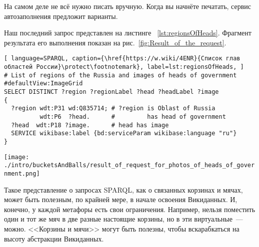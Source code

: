 На самом деле не всё нужно писать вручную. Когда вы начнёте печатать, сервис автозаполнения предложит варианты.

Наш последний запрос представлен на листинге ~\ref{lst:regionsOfHeads}. Фрагмент результата его выполнения показан на рис.~\ref{fig:Result_of_the_request}.

\lstset{numbers=left, firstnumber=1, frame=single}
\begin{lstlisting}[ language=SPARQL, caption={\href{https://w.wiki/4ENR}{Список глав областей России}\protect\footnotemark}, label=lst:regionsOfHeads, ]
# List of regions of the Russia and images of heads of government
#defaultView:ImageGrid
SELECT DISTINCT ?region ?regionLabel ?head ?headLabel ?image
{
  ?region wdt:P31 wd:Q835714; # ?region is Oblast of Russia
          wdt:P6  ?head.      #         has head of government
  ?head  wdt:P18 ?image.      # head has image
  SERVICE wikibase:label {bd:serviceParam wikibase:language "ru"} 
}
\end{lstlisting}


\begin{figure*}[h!]
\texttt{[image: ./intro/bucketsAndBalls/result\_of\_request\_for\_photos\_of\_heads\_of\_government.png]}
\caption{Результат запроса в виде сетки изображений.}
\label{fig:Result_of_the_request}
\end{figure*}


Такое представление о запросах SPARQL, как о связанных корзинах и мячах, может быть полезным, по крайней мере, в начале освоения Викиданных. И, конечно, у каждой метафоры есть свои ограничения. Например, нельзя поместить один и тот же мяч в две разные настоящие корзины, но в эти виртуальные~--- можно. <<Корзины и мячи>> могут быть полезны, чтобы вскарабкаться на высоту абстракции Викиданных.
